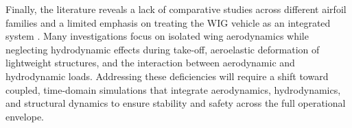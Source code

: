 \noindent Finally, the literature reveals a lack of comparative studies across different airfoil families
and a limited emphasis on treating the WIG vehicle as an integrated system \cite{HINDAWI_Exprerimental_investigation}. Many investigations focus on isolated wing aerodynamics while neglecting hydrodynamic effects during take-off, aeroelastic deformation of lightweight structures, and the interaction between aerodynamic and hydrodynamic loads. Addressing these deficiencies will require a shift toward coupled, time-domain simulations that integrate aerodynamics, hydrodynamics, and structural dynamics to ensure stability and safety across the full operational envelope.
